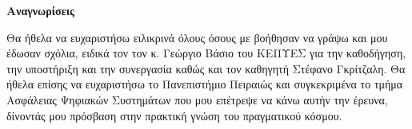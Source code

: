 \begin{center}
    \Large\textbf{Αναγνωρίσεις}
\end{center}

Θα ήθελα να ευχαριστήσω ειλικρινά όλους όσους με βοήθησαν να γράψω και μου
έδωσαν σχόλια, ειδικά τον τον κ. Γεώργιο Βάσιο του ΚΕΠΥΕΣ για την καθοδήγηση,
την υποστήριξη και την συνεργασία καθώς και τον καθηγητή Στέφανο Γκρίτζαλη. Θα
ήθελα επίσης να ευχαριστήσω το Πανεπιστήμιο Πειραιώς και συγκεκριμένα το
τμήμα Ασφάλειας Ψηφιακών Συστημάτων που μου επέτρεψε να κάνω αυτήν την έρευνα,
δίνοντάς μου πρόσβαση στην πρακτική γνώση του πραγματικού κόσμου.

\hspace{2cm}

